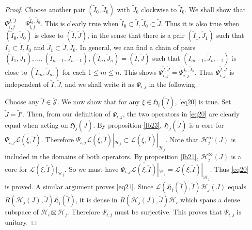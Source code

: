 \documentclass[12pt,a4paper]{article}
\theoremstyle{definition}
\theoremstyle{plain}
\newcommand{\fk}{\mathfrak}
\newcommand{\mc}{\mathcal}
\newcommand{\wtd}{\widetilde}
\newcommand{\ovl}{\overline}
\newcommand{\scr}{\mathscr}
\newcommand{\Jtd}{\widetilde{\mathcal J}}
\numberwithin{equation}{subsection}
\begin{document}
\begin{proof}
Choose another pair $(\wtd I_0,\wtd J_0)$ with $\wtd J_0$ clockwise to $\wtd I_0$. We shall show that $\Psi_{i,j}^{\wtd I,\wtd J}=\Psi_{i,j}^{\wtd I_0,\wtd J_0}$. This is clearly true when $\wtd I_0\subset\wtd I,\wtd J_0\subset\wtd J$. Thus it is also true when $(\wtd I_0,\wtd J_0)$ is close to $(\wtd I,\wtd J)$, in the sense that there is a pair $(\wtd I_1,\wtd J_1)$ such that $\wtd I_1\subset \wtd I,\wtd I_0$ and $\wtd J_1\subset\wtd J,\wtd J_0$. In general, we can find a chain of pairs $(\wtd I_1,\wtd J_1),\dots,(\wtd I_{n-1},\wtd J_{n-1}),(\wtd I_n,\wtd J_n)=(\wtd I,\wtd J)$ such that $(\wtd I_{m-1},\wtd J_{m-1})$ is close to $(\wtd I_m,\wtd J_m)$ for each $1\leq m\leq n$. This shows $\Psi_{i,j}^{\wtd I,\wtd J}=\Psi_{i,j}^{\wtd I_0,\wtd J_0}$. Thus $\Psi_{i,j}^{\wtd I,\wtd J}$ is independent of $\wtd I,\wtd J$, and we shall write it as $\Psi_{i,j}$ in the following.

Choose any $\wtd I\in\Jtd$. We now show that for any $\xi\in\fk H_i(\wtd I)$, \eqref{eq20} is true. Set $\wtd J=\wtd I'$. Then, from our definition of $\Psi_{i,j}$, the  two operators in \eqref{eq20} are clearly equal when acting on $\fk H_j(\wtd J)$. By proposition \ref{lb23}, $\fk H_j(\wtd J)$ is a core for $\Psi_{i,j}\ovl{\mc L(\xi,\wtd I)}$. Therefore $\Psi_{i,j}\ovl{\mc L(\xi,\wtd I)}|_{\mc H_j}\subset \scr L(\xi,\wtd I)|_{\mc H_j}$. Note that $\mc H_j^\infty(J)$ is included in the domains of both operators. By proposition \ref{lb21}, $\mc H_j^\infty(J)$ is a core for $\scr L(\xi,\wtd I)|_{\mc H_j}$. So we must have $\Psi_{i,j}\ovl{\mc L(\xi,\wtd I)}|_{\mc H_j}= \scr L(\xi,\wtd I)|_{\mc H_j}$.   Thus  \eqref{eq20} is proved. A similar argument proves \eqref{eq21}. Since $\scr L(\fk H_i(\wtd I),\wtd I)\mc H_j(J)$ equals $R(\mc H_j(J),\wtd J)\fk H_i(\wtd I)$, it is dense in $R(\mc H_j(J),\wtd J)\mc H_i$ which spans a dense subspace of $\mc H_i\boxtimes\mc H_j$. Therefore $\Psi_{i,j}$ must be surjective. This proves that $\Psi_{i,j}$ is unitary.


\end{proof}
\end{document}
